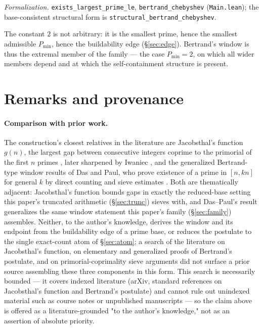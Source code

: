 \documentclass[11pt,a4paper]{amsart}
\theoremstyle{plain}
\theoremstyle{definition}
\theoremstyle{plain}
\theoremstyle{remark}
\newcommand{\lean}[1]{\textup{\texttt{#1}}}
\newcommand{\Formal}[1]{\par\smallskip\noindent\emph{Formalization.} #1\par\smallskip}
\begin{document}
\Formal{\lean{exists\_largest\_prime\_le}, \lean{bertrand\_chebyshev} (\lean{Main.lean});
the base-consistent structural form is \lean{structural\_bertrand\_chebyshev}.}

The constant $2$ is not arbitrary: it is the smallest prime, hence the smallest admissible
$P_{\min}$, hence the buildability edge (\S\ref{sec:edge}). Bertrand's window is thus the
extremal member of the family --- the case $P_{\min}=2$, on which all wider members depend and
at which the self-containment structure is present.

\section{Remarks and provenance}
\label{sec:provenance}

\paragraph{Comparison with prior work.}
The construction's closest relatives in the literature are Jacobsthal's function $g(n)$,
the largest gap between consecutive integers coprime to the primorial of the first $n$
primes \cite{jacobsthal1961}, later sharpened by Iwaniec \cite{iwaniec1978}, and the
generalized Bertrand-type window results of Das and Paul, who prove existence of a prime
in $[n,kn]$ for general $k$ by direct counting and sieve estimates \cite{daspaul2019}. Both
are thematically adjacent: Jacobsthal's function bounds gaps in exactly the reduced-base
setting this paper's truncated arithmetic (\S\ref{sec:trunc}) sieves with, and Das--Paul's
result generalizes the same window statement this paper's family (\S\ref{sec:family})
assembles. Neither, to the author's knowledge, derives the window and its endpoint from the
buildability edge of a prime base, or reduces the postulate to the single exact-count atom
of \S\ref{sec:atom}; a search of the literature on Jacobsthal's function, on elementary and
generalized proofs of Bertrand's postulate, and on primorial-coprimality sieve arguments did
not surface a prior source assembling these three components in this form. This search is
necessarily bounded --- it covers indexed literature (arXiv, standard references on
Jacobsthal's function and Bertrand's postulate) and cannot rule out unindexed material such
as course notes or unpublished manuscripts --- so the claim above is offered as a
literature-grounded "to the author's knowledge," not as an assertion of absolute priority.
\end{document}
